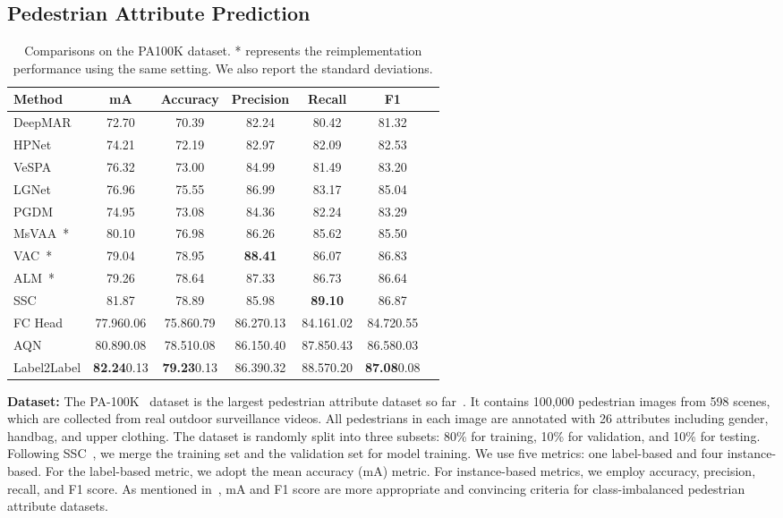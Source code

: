 \documentclass[runningheads]{llncs}
\begin{document}
\subsection{Pedestrian Attribute Prediction}

\begin{table}[t]
  \caption{
    Comparisons on the PA100K dataset. * represents the reimplementation performance using the same setting. We also report the standard deviations.
}
\label{table:result:pa100k}
\renewcommand\tabcolsep{4pt}
\centering
\begin{tabular}{lcccccc}
\toprule
Method  & mA & Accuracy & Precision & Recall & F1 \\
\midrule
DeepMAR~\cite{li2015multi} & 72.70 & 70.39 & 82.24 & 80.42 & 81.32 \\
HPNet~\cite{liu2017hydraplus} & 74.21 & 72.19 & 82.97 & 82.09 & 82.53 \\
VeSPA~\cite{sarfraz2017deep} & 76.32& 73.00& 84.99& 81.49& 83.20 \\
LGNet~\cite{liu2018localization} &76.96 &75.55& 86.99& 83.17& 85.04 \\
PGDM~\cite{li2018pose} & 74.95 & 73.08 & 84.36 & 82.24  & 83.29 \\
\midrule
MsVAA~\cite{sarafianos2018deep}* & 80.10 & 76.98 & 86.26 & 85.62 & 85.50 \\
VAC~\cite{guo2019visual}* & 79.04 & 78.95 & \textbf{88.41} & 86.07 & 86.83 \\
ALM~\cite{tang2019improving}* &  79.26  & 78.64  & 87.33 & 86.73 & 86.64 \\
SSC~\cite{jia2021spatial} & 81.87 & 78.89 & 85.98  & \textbf{89.10} & 86.87 \\
\midrule
FC Head & 77.960.06 & 75.860.79 & 86.270.13 & 84.161.02 & 84.720.55 \\
AQN & 80.890.08 & 78.510.08 & 86.150.40 & 87.850.43 & 86.580.03 \\
Label2Label & \textbf{82.24}0.13 & \textbf{79.23}0.13 & 86.390.32 & 88.570.20 & \textbf{87.08}0.08 \\
\bottomrule
\end{tabular}
\end{table}

\textbf{Dataset:} The PA-100K~\cite{liu2017hydraplus} dataset is
the largest pedestrian attribute dataset so far~\cite{tang2019improving}. It contains 100,000 pedestrian images from 598 scenes, which are collected from real outdoor surveillance videos. All pedestrians in each image are annotated with 26 attributes including gender, handbag, and upper clothing. The dataset is randomly split into three subsets: 80\% for training, 10\% for validation, and 10\% for testing. Following SSC~\cite{jia2021spatial}, we merge the training set and the validation set for model training.
We use five metrics: one label-based and four instance-based. For the label-based metric, we adopt the mean accuracy (mA) metric.
For instance-based metrics, we employ accuracy, precision, recall, and F1 score. As mentioned in~\cite{tang2019improving}, mA and F1 score are more appropriate and convincing criteria for class-imbalanced pedestrian attribute datasets. 
\end{document}

